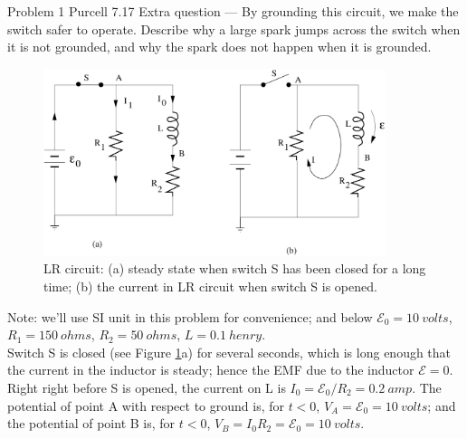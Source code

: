 \documentclass[makesolutionspdf]{esg8022pset}
\begin{document}
\begin{problem}{Problem 1 Purcell 7.17}
 Extra question --- By grounding this circuit, we make the switch
safer to operate. Describe why a large spark jumps across the switch
when it is not grounded, and why the spark does not happen when it is
grounded.
\end{problem}
\begin{solution}


\begin{figure}[H]
    \centering
    \includegraphics[width = 10cm]{inductance2}
    \caption{LR circuit: (a) steady state when switch S has been closed for a
long time; (b) the current in LR circuit when switch S is opened.}
    \label{fig:inductance2.eps}
  \end{figure}




Note: we'll use SI unit in this problem for convenience; and below
${\mathcal{E}}_0=10\:volts$, $R_1=150\:ohms$, $R_2=50\:ohms$,
$L=0.1\:henry$.\\

Switch S is closed (see Figure \ref{fig:inductance2.eps}a) for several
seconds, which is long enough that the current in the inductor is
steady; hence the EMF due to the inductor ${\mathcal{E}}=0$.  Right
right before S is opened, the current on L is $I_0 =
{\mathcal{E}}_0/R_2 = 0.2\:amp$.  The potential of point A with
respect to ground is, for $t<0$, $V_A = {\mathcal{E}}_0 = 10\:volts$;
and the potential of point B is, for $t<0$, $V_B=I_0 R_2=
{\mathcal{E}}_0=10\:volts$.\\


\end{solution}
\end{document}
